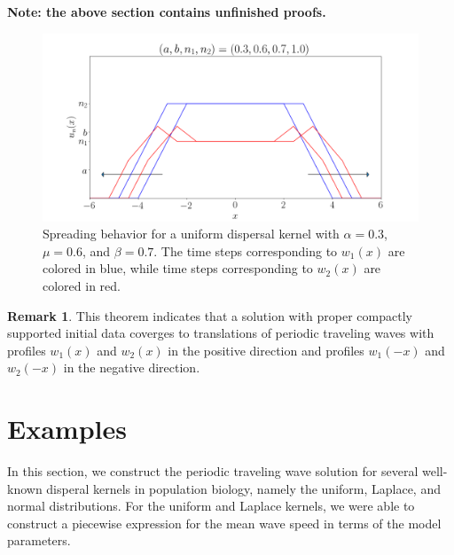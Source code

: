 \documentclass[11pt]{article}
\theoremstyle{definition}
\newtheorem{rem}[thm]{Remark}
\numberwithin{equation}{section}
\numberwithin{thm}{section}
\begin{document}
\textbf{Note: the above section contains unfinished proofs.}




\begin{figure}[h!] 
\centering
  \caption{Spreading behavior for a uniform dispersal kernel with $\alpha=0.3$, $\mu=0.6$, and $\beta=0.7$. The time steps corresponding to $w_1(x)$ are colored in blue, while time steps corresponding to $w_2(x)$ are colored in red.}
\label{fig5}
  \includegraphics[width=.8\linewidth]{figures/fig5.png}
\end{figure}

\begin{rem}
This theorem indicates that a solution with proper compactly supported initial data coverges to translations of periodic traveling waves with profiles $w_1(x)$ and $w_2(x)$ in the positive direction and profiles $w_1(-x)$ and $w_2(-x)$ in the negative direction.
\end{rem}


\section{Examples}

In this section, we construct the periodic traveling wave solution for several well-known disperal kernels in population biology, namely the uniform, Laplace, and normal distributions. For the uniform and Laplace kernels, we were able to construct a piecewise expression for the mean wave speed in terms of the model parameters. 
\end{document}
